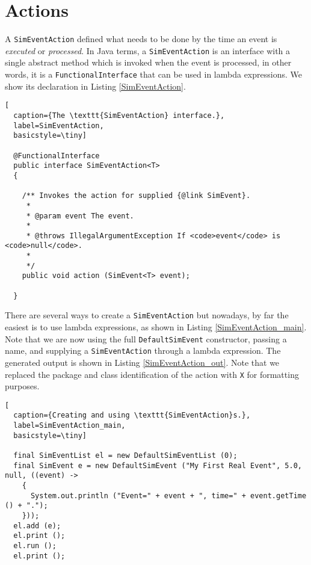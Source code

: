 \section{Actions}

A \lstinline{SimEventAction} defined what needs to be done by the time an event
  is {\em executed\/} or {\em processed}.
In Java terms, a \lstinline{SimEventAction} is an interface with
  a single abstract method which is invoked when the event is processed,
  in other words, it is a \lstinline|FunctionalInterface|
  that can be used in lambda expressions.
We show its declaration in Listing \ref{SimEventAction}.

\begin{lstfloat}
\begin{lstlisting}[
  caption={The \texttt{SimEventAction} interface.},
  label=SimEventAction,
  basicstyle=\tiny]

  @FunctionalInterface
  public interface SimEventAction<T>
  {

    /** Invokes the action for supplied {@link SimEvent}.
     *
     * @param event The event.
     *
     * @throws IllegalArgumentException If <code>event</code> is <code>null</code>.
     * 
     */
    public void action (SimEvent<T> event);

  }

\end{lstlisting}
\end{lstfloat}

There are several ways to create a \lstinline|SimEventAction|
  but nowadays, by far the easiest is to use lambda expressions,
  as shown in Listing \ref{SimEventAction_main}.
Note that we are now using the full \lstinline{DefaultSimEvent} constructor,
  passing a name, and supplying a \lstinline{SimEventAction}
  through a lambda expression.
The generated output is shown in Listing \ref{SimEventAction_out}.
Note that we replaced the package and class identification
  of the action with \lstinline|X| for formatting purposes.

\begin{lstfloat}  
\begin{lstlisting}[
  caption={Creating and using \texttt{SimEventAction}s.},
  label=SimEventAction_main,
  basicstyle=\tiny]
  
  final SimEventList el = new DefaultSimEventList (0);
  final SimEvent e = new DefaultSimEvent ("My First Real Event", 5.0, null, ((event) ->
    {
      System.out.println ("Event=" + event + ", time=" + event.getTime () + ".");
    }));
  el.add (e);
  el.print ();
  el.run ();
  el.print ();

\end{lstlisting}
\end{lstfloat}

